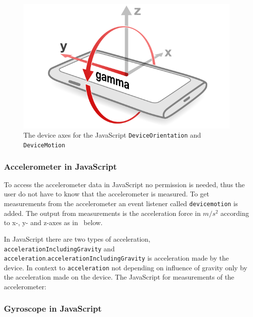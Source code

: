 \begin{figure}[H]
\begin{minipage}[c]{.23\textwidth}
  \end{minipage}
  \hspace{1.5cm}
  \begin{minipage}[c]{.23\textwidth}
    \centering
    \includegraphics[scale=0.2]{img/device-gamma}
    \hspace{1cm}
  \end{minipage}
  \caption{The device axes for the JavaScript \texttt{DeviceOrientation} and \texttt{DeviceMotion}}
  \label{fig:device-rot}
\end{figure}

\subsubsection{Accelerometer in JavaScript}
To access the accelerometer data in JavaScript no permission is needed, thus the user do not have to know that the accelerometer is measured. To get measurements from the accelerometer an event listener called \texttt{devicemotion} is added. The output from measurements is the acceleration force in $m/s^2$ according to x-, y- and z-axes as in~ below. 

In JavaScript there are two types of acceleration, \texttt{accelerationIncludingGravity} and \texttt{acceleration}.\texttt{accelerationIncludingGravity} is acceleration made by the device. In context to \texttt{acceleration} not depending on influence of gravity only by the acceleration made on the device. 
The JavaScript for measurements of the accelerometer:

\cite[]{sensor:DeviceOrientation:spec}

\subsubsection{Gyroscope in JavaScript}